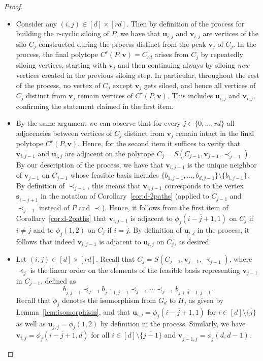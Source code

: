 \documentclass[centering,11pt,reqno]{amsart}
\theoremstyle{definition}
\begin{document}
\begin{proof}
\noindent
\begin{itemize}
    \item Consider any $(i,j)\in [d]\times [rd]$. Then by definition of the process for building the $r$-cyclic siloing of $P$, we have that $\mathbf{u}_{i,j}$ and $\mathbf{v}_{i,j}$ are vertices of the silo $C_j$ constructed during the process distinct from the peak $\mathbf{v}_j$ of $C_j$. In the process, the final polytope $C^r(P,\mathbf{v})=C_{rd}$ arises from $C_j$ by repeatedly siloing vertices, starting with $\mathbf{v}_j$ and then continuing always by siloing \emph{new} vertices created in the previous siloing step. In particular, throughout the rest of the process, no vertex of $C_j$ except $\mathbf{v}_j$ gets siloed, and hence all vertices of $C_j$ distinct from $\mathbf{v}_j$ remain vertices of $C^r(P,\mathbf{v})$. This includes $\mathbf{u}_{i,j}$ and $\mathbf{v}_{i,j}$, confirming the statement claimed in the first item. 
    \item By the same argument we can observe that for every $j\in \{0,\ldots,rd\}$ all adjacencies between vertices of $C_j$ distinct from $\mathbf{v}_j$ remain intact in the final polytope $C^r(P,\mathbf{v})$. Hence, for the second item it suffices to verify that $\mathbf{v}_{i,j-1}$ and $\mathbf{u}_{i,j}$ are adjacent on the polytope $C_j=S(C_{j-1},\mathbf{v}_{j-1},\prec_{j-1})$. By our description of the process, we have that $\mathbf{v}_{i,j-1}$ is the unique neighbor of $\mathbf{v}_{j-1}$ on $C_{j-1}$ whose feasible basis includes $\{b_{1,j-1},\ldots,b_{d,j-1}\}\setminus \{b_{i,j-1}\}$. By definition of $\prec_{j-1}$, this means that $\mathbf{v}_{i,j-1}$ corresponds to the vertex $\mathbf{s}_{\overline{i-j+1}}$ in the notation of Corollary~\ref{cor:d-2paths} (applied to $C_{j-1}$ and $\prec_{j-1}$ instead of $P$ and $\prec$). Hence, it follows from the first item of Corollary~\ref{cor:d-2paths} that $\mathbf{v}_{i,j-1}$ is adjacent to $\phi_j(\overline{i-j+1},1)$ on $C_j$ if $i\neq \overline{j}$ and to $\phi_j(1,2)$ on $C_j$ if $i=\overline{j}$. By definition of $\mathbf{u}_{i,j}$ in the process, it follows that indeed $\mathbf{v}_{i,j-1}$ is adjacent to $\mathbf{u}_{i,j}$ on $C_j$, as desired.
    \item Let $(i,j)\in [d]\times [rd]$. Recall that $C_{j}=S(C_{j-1},\mathbf{v}_{j-1},\prec_{j-1})$, where $\prec_j$ is the linear order on the elements of the feasible basis representing $\mathbf{v}_{j-1}$ in $C_{j-1}$, defined as 
$$b_{\overline{j},j-1}\prec_{j-1} b_{\overline{j+1},j-1}\prec_{j-1} \cdots \prec_{j-1} b_{\overline{j+d-1},j-1}.$$ Recall that $\phi_{j}$ denotes the isomorphism from $G_d$ to $H_{j}$ as given by Lemma~\ref{lem:isomorphism}, and that $\mathbf{u}_{i,j}=\phi_{j}(\overline{i-j+1},1)$ for $i\in [d]\setminus\{\overline{j}\}$ as well as $\mathbf{u}_{\overline{j},j}=\phi_{j}(1,2)$ by definition in the process. Similarly, we have $\mathbf{v}_{i,j}=\phi_{j}(\overline{i-j+1},d)$ for all $i\in [d]\setminus \{\overline{j-1}\}$ and $\mathbf{v}_{\overline{j-1},j}=\phi_{j}(d,d-1)$.  


\end{itemize}
\end{proof}
\end{document}
